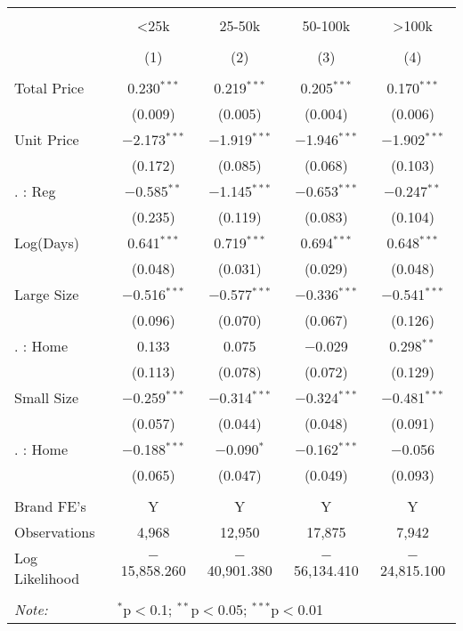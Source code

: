 
\begin{table}[!htbp] \centering 
  \caption{} 
  \label{} 
\begin{tabular}{@{\extracolsep{5pt}}lcccc} 
\\[-1.8ex]\hline 
\hline \\[-1.8ex] 
 & <25k & 25-50k & 50-100k & >100k \\ 
\\[-1.8ex] & (1) & (2) & (3) & (4)\\ 
\hline \\[-1.8ex] 
 Total Price & 0.230$^{***}$ & 0.219$^{***}$ & 0.205$^{***}$ & 0.170$^{***}$ \\ 
  & (0.009) & (0.005) & (0.004) & (0.006) \\ 
  Unit Price & $-$2.173$^{***}$ & $-$1.919$^{***}$ & $-$1.946$^{***}$ & $-$1.902$^{***}$ \\ 
  & (0.172) & (0.085) & (0.068) & (0.103) \\ 
  . : Reg & $-$0.585$^{**}$ & $-$1.145$^{***}$ & $-$0.653$^{***}$ & $-$0.247$^{**}$ \\ 
  & (0.235) & (0.119) & (0.083) & (0.104) \\ 
  Log(Days) & 0.641$^{***}$ & 0.719$^{***}$ & 0.694$^{***}$ & 0.648$^{***}$ \\ 
  & (0.048) & (0.031) & (0.029) & (0.048) \\ 
  Large Size & $-$0.516$^{***}$ & $-$0.577$^{***}$ & $-$0.336$^{***}$ & $-$0.541$^{***}$ \\ 
  & (0.096) & (0.070) & (0.067) & (0.126) \\ 
  . : Home & 0.133 & 0.075 & $-$0.029 & 0.298$^{**}$ \\ 
  & (0.113) & (0.078) & (0.072) & (0.129) \\ 
  Small Size & $-$0.259$^{***}$ & $-$0.314$^{***}$ & $-$0.324$^{***}$ & $-$0.481$^{***}$ \\ 
  & (0.057) & (0.044) & (0.048) & (0.091) \\ 
  . : Home & $-$0.188$^{***}$ & $-$0.090$^{*}$ & $-$0.162$^{***}$ & $-$0.056 \\ 
  & (0.065) & (0.047) & (0.049) & (0.093) \\ 
 \hline \\[-1.8ex] 
Brand FE's & Y & Y & Y & Y \\ 
Observations & 4,968 & 12,950 & 17,875 & 7,942 \\ 
Log Likelihood & $-$15,858.260 & $-$40,901.380 & $-$56,134.410 & $-$24,815.100 \\ 
\hline 
\hline \\[-1.8ex] 
\textit{Note:}  & \multicolumn{4}{l}{$^{*}$p$<$0.1; $^{**}$p$<$0.05; $^{***}$p$<$0.01} \\ 
\end{tabular} 
\end{table} 

